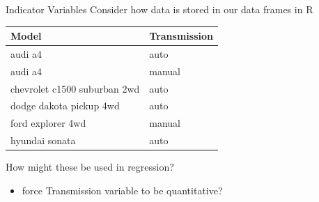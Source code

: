 \documentclass{beamer}
\begin{document}

\begin{frame}{Indicator Variables}
Consider how data is stored in our data frames in R \vspace{4mm}
\begin{table}[ht]
\centering
\begin{tabular}{ll}
  \hline
Model & Transmission \\ 
  \hline
audi a4 & auto \\ 
  audi a4 & manual \\ 
  chevrolet c1500 suburban 2wd & auto \\ 
  dodge dakota pickup 4wd & auto \\ 
  ford explorer 4wd & manual \\ 
  hyundai sonata & auto \\ 
   \hline
\end{tabular}
\end{table}
\vspace{4mm}
How might these be used in regression?
\begin{itemize}
    \item force Transmission variable to be quantitative?
\end{itemize}
\end{frame}
\end{document}
